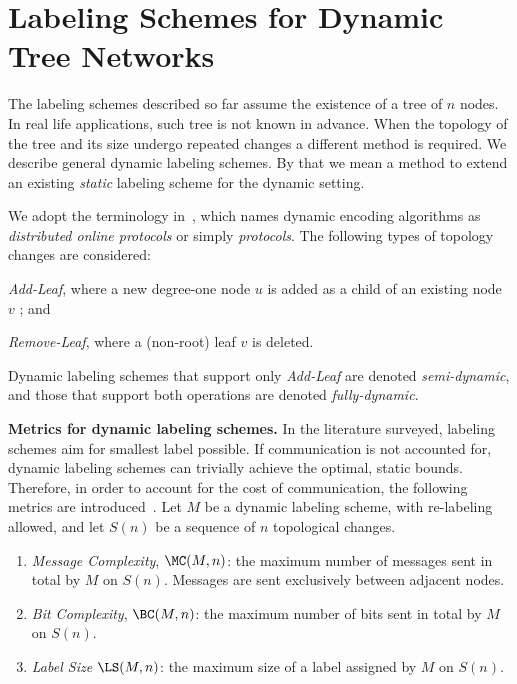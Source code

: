 \section{Labeling Schemes for Dynamic Tree Networks }\label{section:dynamic}
The labeling schemes described so far assume the existence of a tree of $n$ nodes. In real life applications, such tree is not known in advance. When the topology of the tree and its size undergo repeated changes a different method is required.
We describe  general dynamic labeling schemes. By that we mean  a method to extend an existing \emph{static} labeling scheme for the dynamic setting.
		
		
We adopt the terminology in~\cite{korman2004labeling}, which names dynamic encoding algorithms as \emph{distributed online protocols} or simply \emph{protocols}.
The following types of topology changes are considered:
	\begin{inparaenum}
			\item \emph{Add-Leaf}, where a new degree-one node $u$ is added as a child of an existing node $v$
			; and \item \emph{Remove-Leaf}, where a  (non-root) leaf $v$ is deleted.
	\end{inparaenum}
Dynamic labeling schemes that support only \emph{Add-Leaf} are denoted  \emph{semi-dynamic}, and those that support both operations are denoted  \emph{fully-dynamic}.

\textbf{Metrics  for dynamic labeling schemes.} In the literature surveyed, labeling schemes aim for smallest label possible.
If communication is not accounted for, dynamic labeling schemes can trivially achieve the optimal, static bounds.
Therefore, in order to account for the cost of communication, the following  metrics are introduced~\cite{korman2004labeling}.
Let $M$ be a dynamic labeling scheme, with re-labeling allowed, and let $S(n)$ be a sequence of $n$ topological changes.
\begin{enumerate}
	\item \emph{Message Complexity}, $\MC(M, n)$: the maximum number of messages sent in total by $M$ on $S(n)$. Messages are sent  exclusively between adjacent  nodes.
	\item \emph{Bit Complexity}, $\BC(M, n)$: the maximum number of bits sent in total by $M$ on $S(n)$.
	\item \emph{Label Size} $\LS(M,n)$:  the maximum size of a label assigned by $M$ on $S(n)$.
\end{enumerate}

